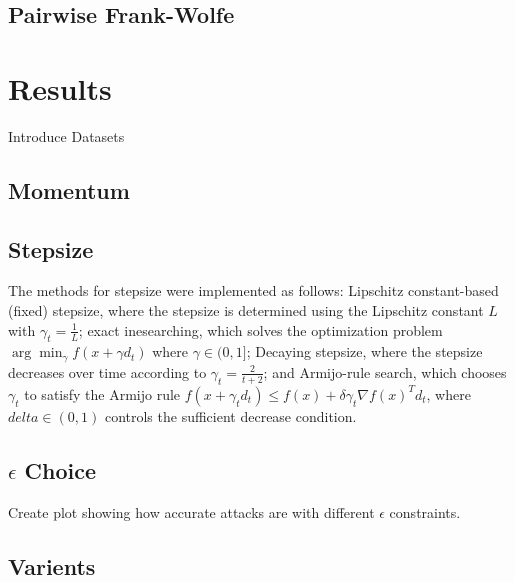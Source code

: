 \documentclass{article}
\begin{document}
\subsection{Pairwise Frank-Wolfe}

\section{Results}
Introduce Datasets
\subsection{Momentum}

\subsection{Stepsize}
The methods for stepsize were implemented as follows: Lipschitz constant-based (fixed) stepsize, where the stepsize is determined using the Lipschitz constant \(L\) with \(\gamma_t = \frac{1}{L}\); exact inesearching, which solves the optimization problem \(\arg \min_{\gamma} f(x + \gamma d_t)\) where \(\gamma \in (0,1]\); Decaying stepsize, where the stepsize decreases over time according to \(\gamma_t = \frac{2}{t + 2}\); and Armijo-rule search, which chooses \(\gamma_t\) to satisfy the Armijo rule \(f(x + \gamma_t d_t) \leq f(x) + \delta \gamma_t \nabla f(x)^T d_t\), where \(delta \in (0,1)\) controls the sufficient decrease condition.

\subsection{$\epsilon$ Choice}
Create plot showing how accurate attacks are with different $\epsilon$ constraints.

\subsection{Varients}
\end{document}

